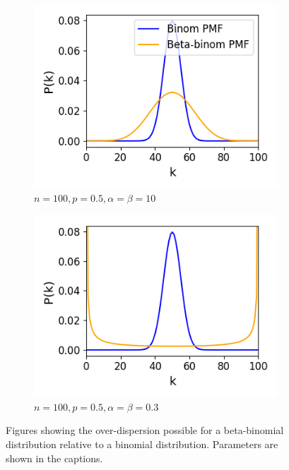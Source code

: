 \documentclass[a4paper,12pt]{article}
\theoremstyle{definition}
\begin{document}
      \begin{figure}[h]
        \begin{subfigure}[h]{0.5\linewidth}
          \includegraphics[width=\textwidth]{figures/betabinomial_overdispersion.png}
          \caption{$n=100, p=0.5, \alpha=\beta=10$}
          \label{fig:betabinomial_overdispersion}
        \end{subfigure}
        \begin{subfigure}[h]{0.5\linewidth}
          \includegraphics[width=\textwidth]{figures/betabinomial_big_overdispersion.png}
          \caption{$n=100, p=0.5, \alpha=\beta=0.3$}
          \label{fig:betabinomial_big_overdispersion}
        \end{subfigure}
        \caption{Figures showing the over-dispersion possible for a beta-binomial distribution relative to a binomial distribution. Parameters are shown in the captions. }
      \end{figure}
\end{document}
